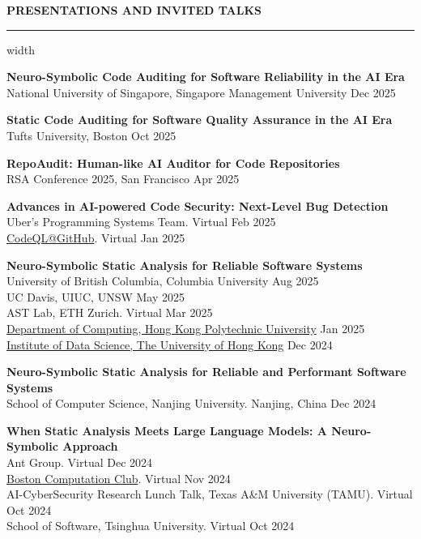\documentclass[centered]{resume}
\newlength{\cvsectiongap}
\newenvironment{rSection}[1]{%
  \par\Needspace{5\baselineskip}\addvspace{\cvsectiongap}
  {\bfseries \MakeUppercase{#1}}\vspace{0.65em}%
  \noindent\hrule width \linewidth\vspace{-0.45em}\par
}{\par}
\begin{document}
\begin{resume}
\begin{rSection}{Presentations and Invited Talks}

\textbf{Neuro-Symbolic Code Auditing for Software Reliability in the AI Era}\\
National University of Singapore, Singapore Management University \hfill Dec 2025

\textbf{Static Code Auditing for Software Quality Assurance in the AI Era}\\
Tufts University, Boston \hfill Oct 2025

\textbf{RepoAudit: Human-like AI Auditor for Code Repositories}\\
RSA Conference 2025, San Francisco \hfill Apr 2025


\textbf{Advances in AI-powered Code Security: Next-Level Bug Detection}\\
Uber's Programming Systems Team. Virtual \hfill Feb 2025\\
\href{https://www.youtube.com/watch?v=nOS56VC0FTQ}{CodeQL@GitHub}. Virtual \hfill Jan 2025

\textbf{Neuro-Symbolic Static Analysis for Reliable Software Systems}\\
University of British Columbia, Columbia University \hfill Aug 2025\\
UC Davis, UIUC, UNSW \hfill May 2025\\
AST Lab, ETH Zurich. Virtual \hfill Mar 2025\\
\href{https://www.polyu.edu.hk/comp/-/media/department/comp/events/research-seminar/2025/20250103_dr-chengpeng-wang.pdf?rev=3dd0f812619941cea495bb8afe0758b7&hash=C8B06503F5BDA6306D88846BCCF604E7}{Department of Computing, Hong Kong Polytechnic University} \hfill Jan 2025\\
\href{https://datascience.hku.hk/2024/12/ids-distinguished-speaker-series-8-neuro-symbolic-static-analysis-for-reliable-software-systems/}{Institute of Data Science, The University of Hong Kong} \hfill Dec 2024

\textbf{Neuro-Symbolic Static Analysis for Reliable and Performant Software Systems}\\
School of Computer Science, Nanjing University. Nanjing, China \hfill Dec 2024

\textbf{When Static Analysis Meets Large Language Models: A Neuro-Symbolic Approach}\\
Ant Group. Virtual \hfill Dec 2024\\
\href{https://bstn.cc/}{Boston Computation Club}. Virtual \hfill Nov 2024\\
AI-CyberSecurity Research Lunch Talk, Texas A\&M University (TAMU). Virtual \hfill Oct 2024\\
School of Software, Tsinghua University. Virtual \hfill Oct 2024


\end{rSection}
\end{resume}
\end{document}
